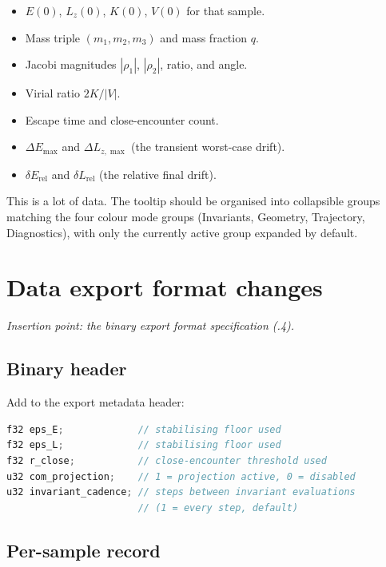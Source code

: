 \documentclass[11pt]{article}
\newcommand{\specref}[1]{\textsection#1}
\begin{document}
\begin{itemize}[nosep]
    \item $E(0)$, $L_z(0)$, $K(0)$, $V(0)$ for that sample.
    \item Mass triple $(m_1, m_2, m_3)$ and mass fraction $q$.
    \item Jacobi magnitudes $|\rho_1|$, $|\rho_2|$, ratio, and angle.
    \item Virial ratio $2K/|V|$.
    \item Escape time and close-encounter count.
    \item $\Delta E_{\max}$ and $\Delta L_{z,\max}$ (the transient worst-case drift).
    \item $\delta E_{\text{rel}}$ and $\delta L_{\text{rel}}$ (the relative final drift).
\end{itemize}

This is a lot of data. The tooltip should be organised into collapsible groups
matching the four colour mode groups (Invariants, Geometry, Trajectory,
Diagnostics), with only the currently active group expanded by default.

\section{Data export format changes}
\label{sec:export}

\textit{Insertion point: the binary export format specification (\specref{26.2.4}).}

\subsection{Binary header}

Add to the export metadata header:

\begin{lstlisting}[language=C]
f32 eps_E;             // stabilising floor used
f32 eps_L;             // stabilising floor used
f32 r_close;           // close-encounter threshold used
u32 com_projection;    // 1 = projection active, 0 = disabled
u32 invariant_cadence; // steps between invariant evaluations
                       // (1 = every step, default)
\end{lstlisting}

\subsection{Per-sample record}
\end{document}
